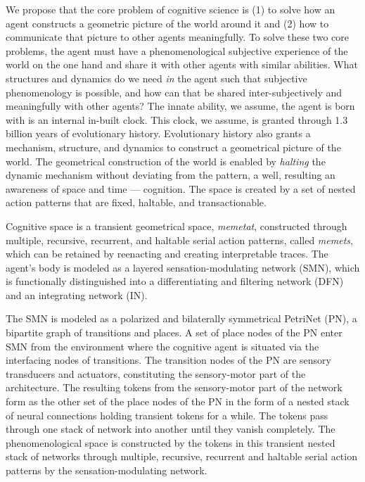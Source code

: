 We propose that the core problem of cognitive science is (1) to solve how an agent constructs a geometric picture of the world around it and (2) how to communicate that picture to other agents meaningfully.  To solve these two core problems, the agent must have a phenomenological subjective experience of the world on the one hand and share it with other agents with similar abilities.  What structures and dynamics do we need \textit{in} the agent such that subjective phenomenology is possible, and how can that be shared inter-subjectively and meaningfully with other agents? The innate ability, we assume, the agent is born with is an internal in-built clock.  This clock, we assume, is granted through 1.3 billion years of evolutionary history.  Evolutionary history also grants a mechanism, structure, and dynamics to construct a geometrical picture of the world.  The geometrical construction of the world is enabled by \textit{halting} the dynamic mechanism without deviating from the pattern, a well, resulting an awareness of space and time --- cognition.  The space is created by a set of nested action patterns that are fixed, haltable, and transactionable. 

Cognitive space is a transient geometrical space, \textit{memetat}, constructed through multiple, recursive, recurrent, and haltable serial action patterns, called \textit{memets}, which can be retained by reenacting and creating interpretable traces. The agent's body is modeled as a layered sensation-modulating network (SMN), which is functionally distinguished into a differentiating and filtering network (DFN) and an integrating network (IN).  

The SMN is modeled as a polarized and bilaterally symmetrical PetriNet (PN), a bipartite graph of transitions and places.  A set of place nodes of the PN enter SMN from the environment where the cognitive agent is situated via the interfacing nodes of transitions. The transition nodes of the PN are sensory transducers and actuators, constituting the sensory-motor part of the architecture. The resulting tokens from the sensory-motor part of the network form as the other set of the place nodes of the PN in the form of a nested stack of neural connections holding transient tokens for a while.   The tokens pass through one stack of network into another until they vanish completely.  The phenomenological space is constructed by the tokens in this transient nested stack of networks through multiple, recursive, recurrent and haltable serial action patterns by the sensation-modulating network.   

